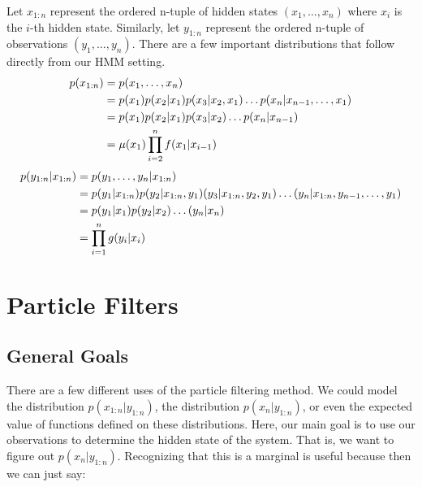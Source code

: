 \documentclass{article}
\begin{document}
Let $x_{1:n}$ represent the ordered n-tuple of hidden states $(x_1,\dots,x_n)$ where $x_i$ is the $i$-th hidden state. Similarly, let $y_{1:n}$ represent the ordered n-tuple of observations $(y_1,\dots,y_n)$. There are a few important distributions that follow directly from our HMM setting.
\begin{equation} \label{p(x_{1:n})}
\begin{split}
p(x_{1:n}) &= p(x_1,\dots,x_n)\\
&= p(x_1)p(x_2|x_1)p(x_3|x_2,x_1)\dots p(x_n|x_{n-1},\dots,x_1)\\
&= p(x_1)p(x_2|x_1)p(x_3|x_2)\dots p(x_n|x_{n-1})\\
&=\mu(x_1)\prod_{i=2}^{n} f(x_1|x_{i-1})\\
\end{split}
\end{equation}
\begin{equation} \label{p(y_{1:n}|x_{1:n})}
\begin{split}
p(y_{1:n}|x_{1:n}) &= p(y_1,\dots,y_n|x_{1:n})\\
&= p(y_1|x_{1:n})p(y_2|x_{1:n},y_1)(y_3|x_{1:n},y_2,y_1)\dots (y_n|x_{1:n},y_{n-1},\dots,y_1)\\
&= p(y_1|x_1)p(y_2|x_2)\dots (y_n|x_n)\\
&= \prod_{i=1}^{n} g(y_i|x_i)\\
\end{split}
\end{equation}



\section{Particle Filters}
\subsection{General Goals}
There are a few different uses of the particle filtering method. We could model the distribution $p(x_{1:n}|y_{1:n})$, the distribution $p(x_n|y_{1:n})$, or even the expected value of functions defined on these distributions. Here, our main goal is to use our observations to determine the hidden state of the system. That is, we want to figure out $p(x_{n}|y_{1:n})$. Recognizing that this is a marginal is useful because then we can just say:
\end{document}
